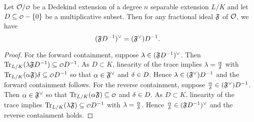     \begin{proposition}\label{prop:localization_of_dual_is_dual_of_localization}
      Let $\mc{O}/\smc{O}$ be a Dedekind extension of a degree $n$ separable extension $L/K$ and let $D \subseteq \smc{O}-\{0\}$ be a multiplicative subset. Then for any fractional ideal $\mathfrak{F}$ of $\mathcal{O}$, we have
      \[
        (\mathfrak{F}D^{-1})^{\vee} = (\mathfrak{F}^{\vee})D^{-1}.
      \]
    \end{proposition}
    \begin{proof}
      For the forward containment, suppose $\lambda \in (\mathfrak{F}D^{-1})^{\vee}$. Then $\Trace_{L/K}(\l\mf{F}D^{-1}) \subseteq \smc{O}D^{-1}$. As $D \subset K$, linearity of the trace implies $\lambda = \frac{\alpha}{\delta}$ with $\Trace_{L/K}(\a\mf{F})\d \subseteq \smc{O}D^{-1}$ so that $\alpha \in \mathfrak{F}^{\vee}$ and $\delta \in D$. Hence $\lambda \in (\mathfrak{F}^{\vee})D^{-1}$ and the forward containment follows. For the reverse containment, suppose $\frac{\alpha}{\delta} \in (\mathfrak{F}^{\vee})D^{-1}$. Then $\alpha \in \mathfrak{F}^{\vee}$ so that $\Trace_{L/K}(\a\mf{F}) \subseteq \smc{O}$ and $\delta \in D$. As $D \subset K$, linearity of the trace implies $\Trace_{L/K}(\l\mf{F}) \subseteq \smc{O}D^{-1}$ with $\lambda = \frac{\alpha}{\delta}$. Hence $\frac{\alpha}{\delta} \in (\mathfrak{F}D^{-1})^{\vee}$ and the reverse containment holds.
    \end{proof}
    
